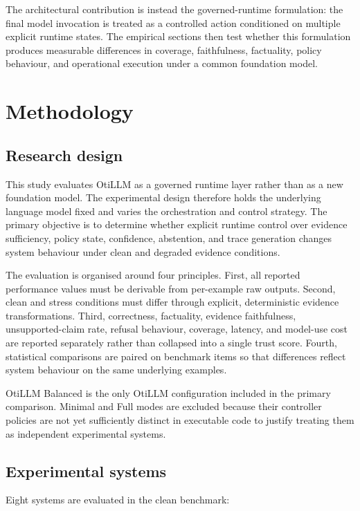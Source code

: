\documentclass[manuscript, screen, review]{jair}
\begin{document}
The architectural contribution is instead the governed-runtime formulation:
the final model invocation is treated as a controlled action conditioned on
multiple explicit runtime states. The empirical sections then test whether
this formulation produces measurable differences in coverage, faithfulness,
factuality, policy behaviour, and operational execution under a common
foundation model.

\section{Methodology}
\subsection{Research design}

This study evaluates OtiLLM as a governed runtime layer rather than as a new
foundation model. The experimental design therefore holds the underlying
language model fixed and varies the orchestration and control strategy. The
primary objective is to determine whether explicit runtime control over
evidence sufficiency, policy state, confidence, abstention, and trace
generation changes system behaviour under clean and degraded evidence
conditions.

The evaluation is organised around four principles. First, all reported
performance values must be derivable from per-example raw outputs. Second,
clean and stress conditions must differ through explicit, deterministic
evidence transformations. Third, correctness, factuality, evidence
faithfulness, unsupported-claim rate, refusal behaviour, coverage, latency,
and model-use cost are reported separately rather than collapsed into a
single trust score. Fourth, statistical comparisons are paired on benchmark
items so that differences reflect system behaviour on the same underlying
examples.

OtiLLM Balanced is the only OtiLLM configuration included in the primary
comparison. Minimal and Full modes are excluded because their controller
policies are not yet sufficiently distinct in executable code to justify
treating them as independent experimental systems.

\subsection{Experimental systems}

Eight systems are evaluated in the clean benchmark:
\end{document}
